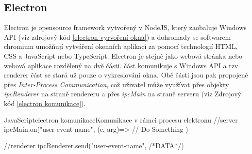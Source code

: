 \documentclass[
  biblatex,
  glossaries,
]{kidiplom}
\begin{document}
\clearpage
\subsection{Electron}
Electron je opensource framework vytvořený v NodeJS, který 
zaobaluje Windows API (viz zdrojový kód \ref{electron vyrvoření okna}) a dohromady se softwarem chromium umožňují 
vytváření okenních aplikací za pomocí technologií HTML, CSS a JavaScript nebo TypeScript.
Electron je stejně jako webová stránka nebo webová aplikace rozdělený
na dvě části.  část komunikuje s Windows API a 
 tzv. renderer část se stará už pouze o vykreslování 
okna. Obě části jsou pak propojené přes \textit{Inter-Process Communication}, 
což uživatel může využívat přes objekty \textit{ipcRenderer} na straně rendereru
a přes \textit{ipcMain} na straně serveru (viz Zdrojový kód \ref{electron komunikace}).


\begin{kicode}{JavaScript}{electron komunikace}{Komunikace v rámci procesu elektronu}
  //server
  ipcMain.on("user-event-name", (e, arg)=>{
    // Do Something
  })

  //renderer
  ipcRenderer.send("user-event-name", {/*DATA*/})
\end{kicode}
\end{document}
